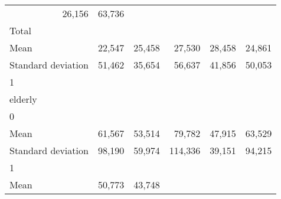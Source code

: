 \begin{tabular}{llllll}
  \multicolumn{1}{r}{26,156} &
  \multicolumn{1}{r}{63,736} \\
\multicolumn{1}{l}{\hspace{3em}Total} &
  \multicolumn{1}{|r}{} &
  \multicolumn{1}{r}{} &
  \multicolumn{1}{r}{} &
  \multicolumn{1}{r}{} &
  \multicolumn{1}{r}{} \\
\multicolumn{1}{l}{\hspace{4em}Mean} &
  \multicolumn{1}{|r}{22,547} &
  \multicolumn{1}{r}{25,458} &
  \multicolumn{1}{r}{27,530} &
  \multicolumn{1}{r}{28,458} &
  \multicolumn{1}{r}{24,861} \\
\multicolumn{1}{l}{\hspace{4em}Standard deviation} &
  \multicolumn{1}{|r}{51,462} &
  \multicolumn{1}{r}{35,654} &
  \multicolumn{1}{r}{56,637} &
  \multicolumn{1}{r}{41,856} &
  \multicolumn{1}{r}{50,053} \\
\multicolumn{1}{l}{\hspace{1em}1} &
  \multicolumn{1}{|r}{} &
  \multicolumn{1}{r}{} &
  \multicolumn{1}{r}{} &
  \multicolumn{1}{r}{} &
  \multicolumn{1}{r}{} \\
\multicolumn{1}{l}{\hspace{2em}elderly} &
  \multicolumn{1}{|r}{} &
  \multicolumn{1}{r}{} &
  \multicolumn{1}{r}{} &
  \multicolumn{1}{r}{} &
  \multicolumn{1}{r}{} \\
\multicolumn{1}{l}{\hspace{3em}0} &
  \multicolumn{1}{|r}{} &
  \multicolumn{1}{r}{} &
  \multicolumn{1}{r}{} &
  \multicolumn{1}{r}{} &
  \multicolumn{1}{r}{} \\
\multicolumn{1}{l}{\hspace{4em}Mean} &
  \multicolumn{1}{|r}{61,567} &
  \multicolumn{1}{r}{53,514} &
  \multicolumn{1}{r}{79,782} &
  \multicolumn{1}{r}{47,915} &
  \multicolumn{1}{r}{63,529} \\
\multicolumn{1}{l}{\hspace{4em}Standard deviation} &
  \multicolumn{1}{|r}{98,190} &
  \multicolumn{1}{r}{59,974} &
  \multicolumn{1}{r}{114,336} &
  \multicolumn{1}{r}{39,151} &
  \multicolumn{1}{r}{94,215} \\
\multicolumn{1}{l}{\hspace{3em}1} &
  \multicolumn{1}{|r}{} &
  \multicolumn{1}{r}{} &
  \multicolumn{1}{r}{} &
  \multicolumn{1}{r}{} &
  \multicolumn{1}{r}{} \\
\multicolumn{1}{l}{\hspace{4em}Mean} &
  \multicolumn{1}{|r}{50,773} &
  \multicolumn{1}{r}{43,748} &

\end{tabular}
